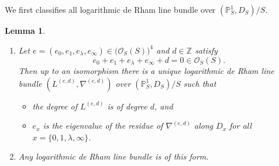 \documentclass[12pt,twoside]{book}
\theoremstyle{plain}
\newtheorem{lemma}[lemma]{Lemma}
\theoremstyle{definition}
\theoremstyle{remark}
\newcommand{\bP}{{\mathbb P}}
\newcommand{\bZ}{{\mathbb Z}}
\newcommand{\mO}{{\mathcal O}}
\numberwithin{equation}{section}
\begin{document}
We first classifies all logarithmic de Rham line bundle over $(\bP^1_S,D_S)/S$.
\begin{lemma} \label{thm_ClassifyLogdRLineBundle}
\begin{enumerate}
\item[$(1)$] Let $e=(e_0,e_1,e_\lambda,e_\infty)\in \Big(\mO_S(S)\Big)^4$ and $d\in \bZ$ satisfy
\[e_0+e_1+e_\lambda+e_\infty + d = 0 \in \mO_S(S).\]
Then up to an isomorphism there is a unique logarithmic de Rham line bundle $(L^{(e,d)},\nabla^{(e,d)})$ over $(\bP^1_S,D_S)/S$ such that
\begin{itemize}
\item the degree of $L^{(e,d)}$ is of degree $d$, and
\item $e_x$ is the eigenvalue of the residue of $\nabla^{(e,d)}$ along $D_x$ for all $x=\{0,1,\lambda,\infty\}$.
\end{itemize}
\item[$(2)$] Any logarithmic de Rham line bundle is of this form.
\end{enumerate}
\end{lemma}
\end{document}
